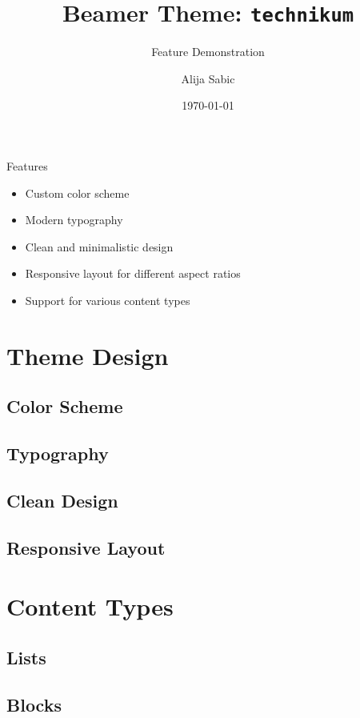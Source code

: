 \documentclass[aspectratio=169]{beamer}
\title{Beamer Theme: \texttt{technikum}}
\subtitle{Feature Demonstration}
\author[Sabic]{Alija Sabic}
\institute{Electronic Engineering \& Entrepreneurship}
\date{\today}
\begin{document}
\begin{frame}
    \titlepage
\end{frame}

\begin{frame}{Features}
    \begin{itemize}
        \item Custom color scheme
        \item Modern typography
        \item Clean and minimalistic design
        \item Responsive layout for different aspect ratios
        \item Support for various content types
    \end{itemize}
\end{frame}

\section{Theme Design}

\subsection{Color Scheme}


\subsection{Typography}


\subsection{Clean Design}


\subsection{Responsive Layout}


\section{Content Types}

\subsection{Lists}


\subsection{Blocks}

\end{document}
